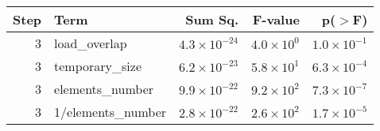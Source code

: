 \begin{table}[ht]
\centering
\begin{tabular}{rlrrr}
  \toprule
Step & Term & Sum Sq. & F-value & p($>$F) \\ 
  \midrule
3 & load\_overlap & $4.3 \times 10^{-24}$ & $4.0 \times 10^{0}$ & $1.0 \times 10^{-1}$ \\ 
  3 & temporary\_size & $6.2 \times 10^{-23}$ & $5.8 \times 10^{1}$ & $6.3 \times 10^{-4}$ \\ 
  3 & elements\_number & $9.9 \times 10^{-22}$ & $9.2 \times 10^{2}$ & $7.3 \times 10^{-7}$ \\ 
  3 & 1/elements\_number & $2.8 \times 10^{-22}$ & $2.6 \times 10^{2}$ & $1.7 \times 10^{-5}$ \\ 
   \bottomrule
\end{tabular}
\end{table}

